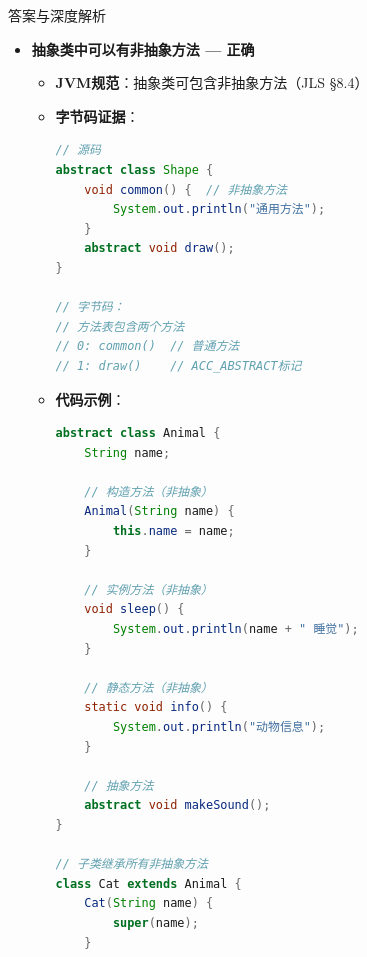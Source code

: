 \documentclass[12pt, a4paper]{ctexart}
\begin{document}
\begin{enumerate}[label=\textbf{\arabic*.}]
\begin{bluebox}{答案与深度解析}
\begin{itemize}[leftmargin=*, nosep, label={}]
\begin{itemize}[label={}, leftmargin=*, nosep]
\begin{lstlisting}[language=Java]
    @Override
    void move() {
        System.out.println("贵宾犬跑步");
    }
}
// 抽象子类可延迟实现具体子类必须实现
				      \end{lstlisting}
				            \item \textbf{命题陷阱}：考生误认为"子类=具体子类"，忽略了抽象子类
				            \item \textbf{字节码标记}：
				                  \begin{lstlisting}[language=Java]
// 抽象子类的字节码
// flags: (0x0400) ACC_ABSTRACT
// 即使有未实现的抽象方法，只要标记为abstract即可
				            \end{lstlisting}
			            \end{itemize}

			      \item[D] \textbf{抽象类中可以有非抽象方法 — 正确}
			            \begin{itemize}[label={}, leftmargin=*, nosep]
				            \item \textbf{JVM规范}：抽象类可包含非抽象方法（JLS §8.4）
				            \item \textbf{字节码证据}：
				                  \begin{lstlisting}[language=Java]
// 源码
abstract class Shape {
    void common() {  // 非抽象方法
        System.out.println("通用方法");
    }
    abstract void draw();
}

// 字节码：
// 方法表包含两个方法
// 0: common()  // 普通方法
// 1: draw()    // ACC_ABSTRACT标记
				            \end{lstlisting}
				            \item \textbf{代码示例}：
				                  \begin{lstlisting}[language=Java]
abstract class Animal {
    String name;

    // 构造方法（非抽象）
    Animal(String name) {
        this.name = name;
    }

    // 实例方法（非抽象）
    void sleep() {
        System.out.println(name + " 睡觉");
    }

    // 静态方法（非抽象）
    static void info() {
        System.out.println("动物信息");
    }

    // 抽象方法
    abstract void makeSound();
}

// 子类继承所有非抽象方法
class Cat extends Animal {
    Cat(String name) {
        super(name);
    }


\end{lstlisting}
\end{itemize}
\end{itemize}
\end{bluebox}
\end{enumerate}
\end{document}
